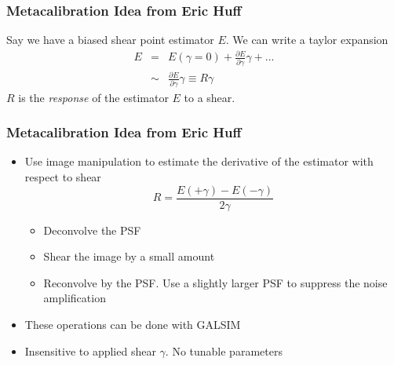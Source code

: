 \documentclass{beamer}
\begin{document}
\frame
{
    \frametitle{Metacalibration Idea from Eric Huff}

 

    {\Large
        Say we have a biased shear point estimator {\color{gold} $E$}.  We can write a taylor
        expansion
        {\color{mygray}
            \begin{eqnarray}
                E & = & E(\gamma=0) + \frac{\partial E}{\partial \gamma} \gamma + ... \nonumber \\
                  & \sim &  \frac{\partial E}{\partial \gamma} \gamma \equiv R \gamma \nonumber 
            \end{eqnarray}
        } 
        {\color{gold} $R$} is the {\em response} of the estimator $E$ to a shear.
    }
}

\frame
{
    \frametitle{Metacalibration Idea from Eric Huff}


    \begin{itemize}

        \item Use image manipulation to estimate the derivative of the
            estimator with respect to shear
            {\color{gold}
                \begin{equation}
                    R = \frac{E(+\gamma) - E(-\gamma)}{2 \gamma} \nonumber 
                \end{equation}
            }
            \begin{itemize}
                \item Deconvolve the PSF
                \item Shear the image by a small amount
                \item Reconvolve by the PSF.  Use a slightly larger PSF to suppress
                    the noise amplification
            \end{itemize}

            \item These operations can be done with GALSIM
            \item Insensitive to applied shear $\gamma$.  {\color{lightskyblue} No tunable parameters}


    \end{itemize}

}
\end{document}
